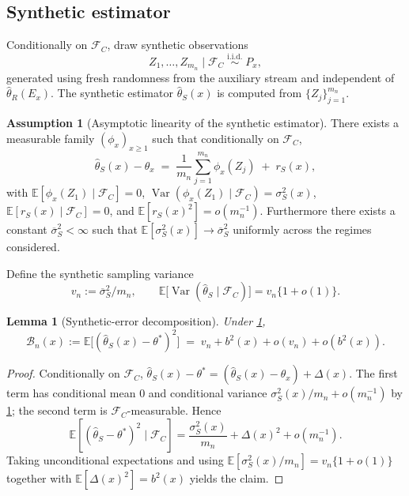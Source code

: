 \documentclass[11pt]{article}
\theoremstyle{plain}
\newtheorem{lemma}[theorem]{Lemma}
\theoremstyle{definition}
\newtheorem{assumption}{Assumption}[section]
\theoremstyle{remark}
\newcommand{\E}{\mathbb{E}}
\newcommand{\Var}{\operatorname{Var}}
\begin{document}
\subsection{Synthetic estimator}
\label{ssec:synth}

Conditionally on $\mathcal{F}_C$, draw synthetic observations
\begin{equation}
Z_1,\dots,Z_{m_n}\mid\mathcal{F}_C\;\overset{\mathrm{i.i.d.}}{\sim}\;P_x,
\end{equation}
generated using fresh randomness from the auxiliary stream and independent of $\hat\theta_R(E_x)$. The synthetic estimator $\hat\theta_S(x)$ is computed from $\{Z_j\}_{j=1}^{m_n}$.

\begin{assumption}[Asymptotic linearity of the synthetic estimator]\label{asm:al-synth}
There exists a measurable family $(\phi_x)_{x\ge1}$ such that conditionally on $\mathcal{F}_C$,
\begin{equation}\label{eq:al-synth}
\hat\theta_S(x)-\theta_x\;=\;\frac{1}{m_n}\sum_{j=1}^{m_n}\phi_x(Z_j)\;+\;r_S(x),
\end{equation}
with $\E[\phi_x(Z_1)\mid\mathcal{F}_C]=0$, $\Var(\phi_x(Z_1)\mid\mathcal{F}_C)=\sigma_S^2(x)$, $\E[r_S(x)\mid\mathcal{F}_C]=0$, and $\E[r_S(x)^2]=o(m_n^{-1})$. Furthermore there exists a constant $\overline\sigma_S^2<\infty$ such that $\E[\sigma_S^2(x)]\to\overline\sigma_S^2$ uniformly across the regimes considered.
\end{assumption}

Define the synthetic sampling variance
\begin{equation}
v_n:=\overline\sigma_S^2/m_n,\qquad \E\bigl[\Var(\hat\theta_S\mid\mathcal{F}_C)\bigr]=v_n\{1+o(1)\}.
\end{equation}

\begin{lemma}[Synthetic-error decomposition]\label{lem:Bn}
Under \cref{asm:al-synth},
\begin{equation}\label{eq:Bn-def}
\mathcal{B}_n(x):=\E\bigl[(\hat\theta_S(x)-\theta^*)^2\bigr]\;=\;v_n+b^2(x)+o(v_n)+o(b^2(x)).
\end{equation}
\end{lemma}

\begin{proof}
Conditionally on $\mathcal{F}_C$, $\hat\theta_S(x)-\theta^*=(\hat\theta_S(x)-\theta_x)+\Delta(x)$. The first term has conditional mean $0$ and conditional variance $\sigma_S^2(x)/m_n+o(m_n^{-1})$ by \cref{asm:al-synth}; the second term is $\mathcal{F}_C$-measurable. Hence
\begin{equation*}
\E[(\hat\theta_S-\theta^*)^2\mid\mathcal{F}_C]=\frac{\sigma_S^2(x)}{m_n}+\Delta(x)^2+o(m_n^{-1}).
\end{equation*}
Taking unconditional expectations and using $\E[\sigma_S^2(x)/m_n]=v_n\{1+o(1)\}$ together with $\E[\Delta(x)^2]=b^2(x)$ yields the claim.
\end{proof}
\end{document}
